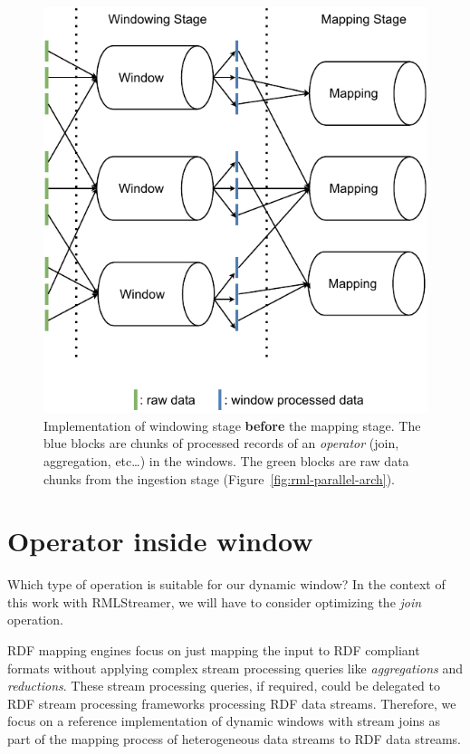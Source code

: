 \begin{figure}[htpb]
    \centering
    \includegraphics[width=0.7\linewidth]{fig/window_site.pdf}
    \caption{Implementation of windowing stage \textbf{before} the mapping stage. The blue blocks 
    are chunks of processed records of an \emph{operator} (join, aggregation, etc\dots) in the windows. 
    The green blocks are raw data chunks from the 
    ingestion stage (Figure~\ref{fig:rml-parallel-arch}). }%
    \label{fig:fig/s}
\end{figure}


\section{Operator inside window}
\label{sec:Operator inside window}
Which type of operation is suitable for our dynamic window? 
In the context of this work with RMLStreamer, we will have to consider optimizing the 
\emph{join} operation.

RDF mapping engines focus 
on just mapping the input to RDF compliant formats without 
applying complex stream processing queries like \emph{aggregations} and 
\emph{reductions}. These stream processing queries, if required, could be 
delegated to RDF stream processing frameworks processing RDF data streams.
Therefore, we focus on a reference implementation of dynamic windows with 
stream joins as part of the mapping process of heterogeneous data streams 
to RDF data streams.




